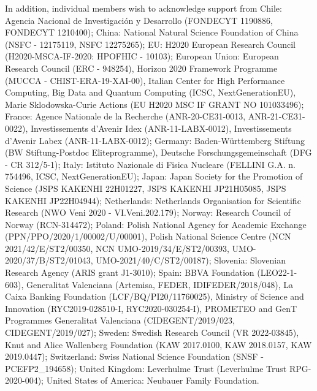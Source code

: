 \documentclass[cernpreprint, atlasdraft=false, texlive=2023, UKenglish, texmf, orcidlogo]{atlasdoc}
\begin{document}
In addition, individual members wish to acknowledge support from Chile: Agencia Nacional de Investigación y Desarrollo (FONDECYT 1190886, FONDECYT 1210400); China: National Natural Science Foundation of China (NSFC - 12175119, NSFC 12275265); EU: H2020 European Research Council (H2020-MSCA-IF-2020: HPOFHIC - 10103); European Union: European Research Council (ERC - 948254), Horizon 2020 Framework Programme (MUCCA - CHIST-ERA-19-XAI-00), Italian Center for High Performance Computing, Big Data and Quantum Computing (ICSC, NextGenerationEU), Marie Sklodowska-Curie Actions (EU H2020 MSC IF GRANT NO 101033496); France: Agence Nationale de la Recherche (ANR-20-CE31-0013, ANR-21-CE31-0022), Investissements d'Avenir Idex (ANR-11-LABX-0012), Investissements d'Avenir Labex (ANR-11-LABX-0012); Germany: Baden-Württemberg Stiftung (BW Stiftung-Postdoc Eliteprogramme), Deutsche Forschungsgemeinschaft (DFG - CR 312/5-1); Italy: Istituto Nazionale di Fisica Nucleare (FELLINI G.A. n. 754496, ICSC, NextGenerationEU); Japan: Japan Society for the Promotion of Science (JSPS KAKENHI 22H01227, JSPS KAKENHI JP21H05085, JSPS KAKENHI JP22H04944); Netherlands: Netherlands Organisation for Scientific Research (NWO Veni 2020 - VI.Veni.202.179); Norway: Research Council of Norway (RCN-314472); Poland: Polish National Agency for Academic Exchange (PPN/PPO/2020/1/00002/U/00001), Polish National Science Centre (NCN 2021/42/E/ST2/00350, NCN UMO-2019/34/E/ST2/00393, UMO-2020/37/B/ST2/01043, UMO-2021/40/C/ST2/00187); Slovenia: Slovenian Research Agency (ARIS grant J1-3010); Spain: BBVA Foundation (LEO22-1-603), Generalitat Valenciana (Artemisa, FEDER, IDIFEDER/2018/048), La Caixa Banking Foundation (LCF/BQ/PI20/11760025), Ministry of Science and Innovation (RYC2019-028510-I, RYC2020-030254-I), PROMETEO and GenT Programmes Generalitat Valenciana (CIDEGENT/2019/023, CIDEGENT/2019/027); Sweden: Swedish Research Council (VR 2022-03845), Knut and Alice Wallenberg Foundation (KAW 2017.0100, KAW 2018.0157, KAW 2019.0447); Switzerland: Swiss National Science Foundation (SNSF - PCEFP2\_194658); United Kingdom: Leverhulme Trust (Leverhulme Trust RPG-2020-004); United States of America: Neubauer Family Foundation.
 


 
 
\clearpage
\printbibliography
 
\clearpage

 

 
 
\end{document}
